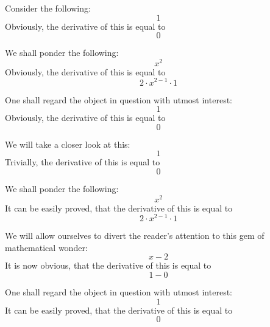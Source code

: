 \documentclass{article}
\begin{document}
Consider the following:
\begin{equation}
1 
\end{equation}
Obviously, the derivative of this is equal to
\begin{equation}
0 
\end{equation}

We shall ponder the following:
\begin{equation}
x ^{2 } 
\end{equation}
Obviously, the derivative of this is equal to
\begin{equation}
2 \cdot x ^{2 - 1 } \cdot 1 
\end{equation}

One shall regard the object in question with utmost interest:
\begin{equation}
1 
\end{equation}
Obviously, the derivative of this is equal to
\begin{equation}
0 
\end{equation}

We will take a closer look at this:
\begin{equation}
1 
\end{equation}
Trivially, the derivative of this is equal to
\begin{equation}
0 
\end{equation}

We shall ponder the following:
\begin{equation}
x ^{2 } 
\end{equation}
It can be easily proved, that the derivative of this is equal to
\begin{equation}
2 \cdot x ^{2 - 1 } \cdot 1 
\end{equation}

We will allow ourselves to divert the reader's attention to this gem of mathematical wonder:
\begin{equation}
x - 2 
\end{equation}
It is now obvious, that the derivative of this is equal to
\begin{equation}
1 - 0 
\end{equation}

One shall regard the object in question with utmost interest:
\begin{equation}
1 
\end{equation}
It can be easily proved, that the derivative of this is equal to
\begin{equation}
0 
\end{equation}
\end{document}
